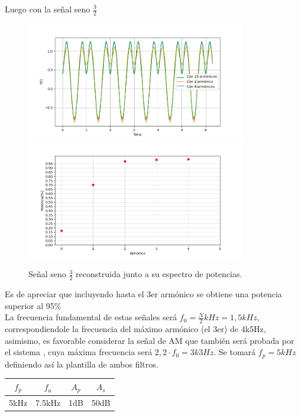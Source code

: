 Luego con la señal seno $\frac{3}{2}$
\begin{figure}[H]
	\centering
	\includegraphics[width=0.85\textwidth]{ImagenesEjercicio2/sen32signal.PNG}
	\includegraphics[width=0.85\textwidth]{ImagenesEjercicio2/sen32signalpot.PNG}
\caption{Señal seno $\frac{3}{2}$ reconstruida junto a su espectro de potencias.}
	\label{fig:potsin}
\end{figure}
Es de apreciar que  incluyendo hasta el 3er armónico se obtiene una potencia superior al 95$\%$ \\
La frecuencia fundamental de estas señales será $f_0 =\frac{N}{2} kHz = 1,5 kHz $, correspondiendole la frecuencia del máximo armónico (el 3er) de 4k5Hz, asimismo, es favorable considerar la señal de AM que también será probada por el sistema , cuya máxima frecuencia será $2,2 \cdot f_0 = 3k3Hz$. Se tomará  $f_p= 5kHz$  definiendo así la plantilla de ambos filtros.
\begin{table}[H]
\centering
\begin{tabular}{cccc}
$f_p$ & $f_a$ & $A_p$ & $A_s$ \\ \hline
5kHz & 7.5kHz & 1dB & 50dB
\end{tabular}
\end{table}
